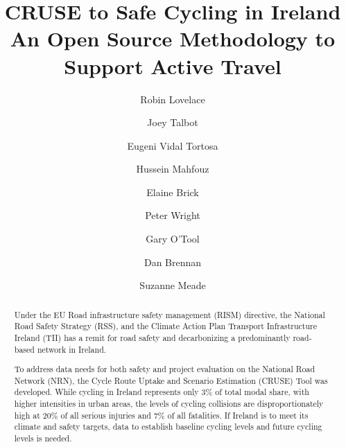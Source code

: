 \documentclass[
  super,
  preprint,
  3p]{elsarticle}
\begin{document}
\begin{frontmatter}
\title{CRUSE to Safe Cycling in Ireland \\\large{An Open Source
Methodology to Support Active Travel} }
\author[1]{Robin Lovelace%
%
}
\author[1]{Joey Talbot%
%
}

\author[1]{Eugeni Vidal Tortosa%
%
}

\author[1]{Hussein Mahfouz%
%
}

\author[2]{Elaine Brick%
%
}

\author[3]{Peter Wright%
%
}

\author[2]{Gary O'Tool%
%
}

\author[4]{Dan Brennan%
%
}

\author[4]{Suzanne Meade%
%
}












        
\begin{abstract}
Under the EU Road infrastructure safety management (RISM) directive, the
National Road Safety Strategy (RSS), and the Climate Action Plan
Transport Infrastructure Ireland (TII) has a remit for road safety and
decarbonizing a predominantly road-based network in Ireland.

To address data needs for both safety and project evaluation on the
National Road Network (NRN), the Cycle Route Uptake and Scenario
Estimation (CRUSE) Tool was developed. While cycling in Ireland
represents only 3\% of total modal share, with higher intensities in
urban areas, the levels of cycling collisions are disproportionately
high at 20\% of all serious injuries and 7\% of all fatalities. If
Ireland is to meet its climate and safety targets, data to establish
baseline cycling levels and future cycling levels is needed.


\end{abstract}
\end{frontmatter}
\end{document}
